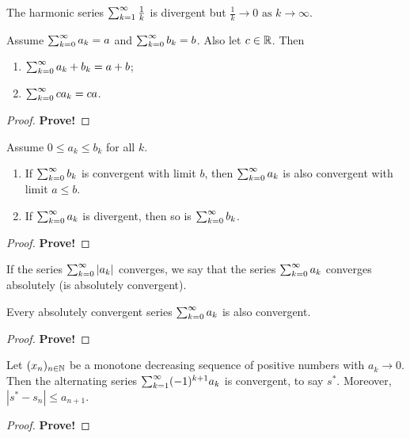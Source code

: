 \documentclass[10pt, a4paper]{article}
\newcommand{\seq}[1][x]{(#1_n)_{n \in \N}}
\newcommand{\limas}[3][n]{#2 \rightarrow #3 \text{ as } #1 \rightarrow \infty}
\begin{document}
\begin{example}
    The harmonic series $\infsum\frac{1}{k}$ is divergent but $\limas[k]{\frac{1}{k}}{0}$.
\end{example}

\begin{theorem}
    Assume $\infsum[k = 0]a_k = a$ and $\infsum[k = 0]b_k = b$.
    Also let $c \in \R$.
    Then
    \begin{enumerate}[label = (\roman*)]
        \item $\infsum[k = 0]{a_k + b_k} = a + b$;
        \item $\infsum[k = 0]{ca_k} = ca$.
    \end{enumerate}
    \begin{proof}
        \textbf{Prove!}
    \end{proof}
\end{theorem}

\begin{theorem}
    Assume $0 \leq a_k \leq b_k$ for all $k$.
    \begin{enumerate}[label = (\roman*)]
        \item If $\infsum[k = 0]b_k$ is convergent with limit $b$,
        then $\infsum[k = 0]a_k$ is also convergent with limit $a \leq b$.
        \item If $\infsum[k = 0]a_k$ is divergent,
        then so is $\infsum[k = 0]b_k$.
    \end{enumerate}
    \begin{proof}
        \textbf{Prove!}
    \end{proof}
\end{theorem}

\begin{definition}
    If the series $\infsum[k = 0]|a_k|$ converges,
    we say that the series $\infsum[k = 0]a_k$ converges absolutely
    (is absolutely convergent).
\end{definition}

\begin{theorem}
    Every absolutely convergent series $\infsum[k = 0]a_k$ is also convergent.
    \begin{proof}
        \textbf{Prove!}
    \end{proof}
\end{theorem}

\begin{theorem}
    Let $\seq$ be a monotone decreasing sequence of positive numbers with $a_k \rightarrow 0$.
    Then the alternating series $\infsum(-1) ^ {k + 1}a_k$ is convergent,
    to say $s ^ {*}$.
    Moreover,
    $|s ^ {*} - s_n| \leq a_{n + 1}$.
    \begin{proof}
        \textbf{Prove!}
    \end{proof}
\end{theorem}
\end{document}
